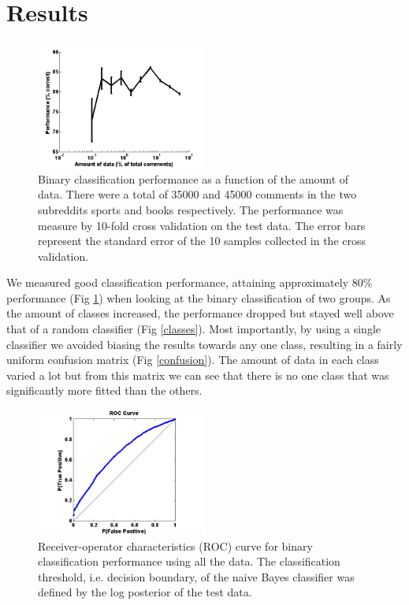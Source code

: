 \documentclass[10pt,twocolumn]{article}
\begin{document}
\section{Results}
\begin{figure}
    \centering
  	\includegraphics[width=0.5\textwidth]{./binary_data.png}
  \caption{ Binary classification performance as a function of the amount of data. There were a total of 35000 and 45000 comments in the two subreddits sports and books respectively. The performance was measure by 10-fold cross validation on the test data. The error bars represent the standard error of the 10 samples collected in the cross validation.}
  	\label{multiclass}
    \end{figure}
We measured good classification performance, attaining approximately $80\%$ performance (Fig \ref{multiclass}) when looking at the binary classification of two groups. As the amount of classes increased, the performance dropped but stayed well above that of a random classifier (Fig \ref{classes}). Most importantly, by using a single classifier we avoided biasing the results towards any one class, resulting in a fairly uniform confusion matrix (Fig \ref{confusion}). The amount of data in each class varied a lot but from this matrix we can see that there is no one class that was significantly more fitted than the others. 


\begin{figure}
    \centering
  	\includegraphics[width=0.5\textwidth]{./roc.png}
  	\caption{Receiver-operator characteristics (ROC) curve for binary classification performance using all the data. The classification threshold, i.e. decision boundary, of the naive Bayes classifier was defined by the log posterior of the test data.}
  	\label{roc}
\end{figure}		
\end{document}

